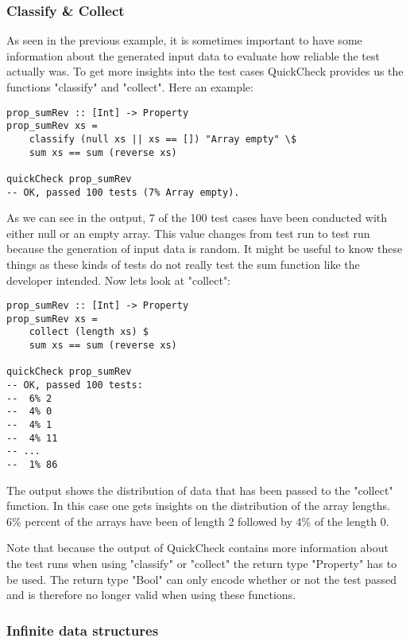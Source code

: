 \documentclass[a4paper, 12pt]{article} %
\begin{document}
\subsubsection{Classify \& Collect}

As seen in the previous example, it is sometimes important to have some information about the generated input data to evaluate how reliable the test actually was. To get more insights into the test cases QuickCheck provides us the functions "classify" and "collect"\cite{Claessen2000}. Here an example:

\begin{verbatim}
prop_sumRev :: [Int] -> Property
prop_sumRev xs = 
    classify (null xs || xs == []) "Array empty" \$
    sum xs == sum (reverse xs)

quickCheck prop_sumRev
-- OK, passed 100 tests (7% Array empty).
\end{verbatim}

As we can see in the output, 7 of the 100 test cases have been conducted with either null or an empty array. This value changes from test run to test run because the generation of input data is random. It might be useful to know these things as these kinds of tests do not really test the sum function like the developer intended. Now lets look at "collect":

\begin{verbatim}
prop_sumRev :: [Int] -> Property
prop_sumRev xs = 
    collect (length xs) $
    sum xs == sum (reverse xs)

quickCheck prop_sumRev
-- OK, passed 100 tests:
--  6% 2 
--  4% 0 
--  4% 1 
--  4% 11 
-- ... 
--  1% 86 
\end{verbatim}

The output shows the distribution of data that has been passed to the "collect" function. In this case one gets insights on the distribution of the array lengths. 6\% percent of the arrays have been of length 2 followed by 4\% of the length 0.

Note that because the output of QuickCheck contains more information about the test runs when using "classify" or "collect" the return type "Property" has to be used. The return type "Bool" can only encode whether or not the test passed and is therefore no longer valid when using these functions. 

\subsubsection{Infinite data structures}
\end{document}

